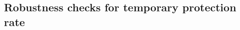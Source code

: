 \documentclass[11pt,a4paper]{scrartcl}
\begin{document}
%
%
%
%
%
%
%
%



\clearpage
\FloatBarrier
\subsection{Robustness checks for temporary protection rate}


\end{document}
